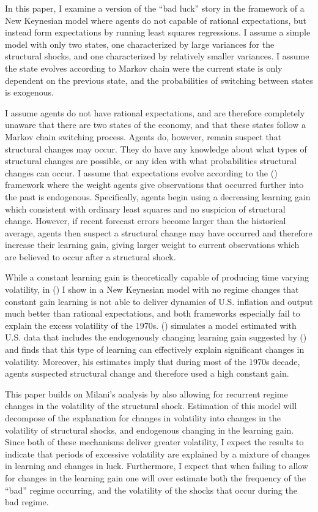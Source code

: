 \documentclass[12pt]{article}
\newcommand{\citee}[1]{\citename{#1} (\citeyear{#1})}
\begin{document}
In this paper, I examine a version of the ``bad luck'' story in the framework of a New Keynesian model where agents do not capable of rational expectations, but instead form expectations by running least squares regressions.  I assume a simple model with only two states, one characterized by large variances for the structural shocks, and one characterized by relatively smaller variances.  I assume the state evolves according to Markov chain were the current state is only dependent on the previous state, and the probabilities of switching between states is exogenous.  

I assume agents do not have rational expectations, and are therefore completely unaware that there are two states of the economy, and that these states follow a Markov chain switching process.  Agents do, however, remain suspect that structural changes may occur.  They do have any knowledge about what types of structural changes are possible, or any idea with what probabilities structural changes can occur.  I assume that expectations evolve according to the \citee{marcetnicolini2003} framework where the weight agents give observations that occurred further into the past is endogenous.  Specifically, agents begin using a decreasing learning gain which consistent with ordinary least squares and no suspicion of structural change.  However, if recent forecast errors become larger than the historical average, agents then suspect a structural change may have occurred and therefore increase their learning gain, giving larger weight to current observations which are believed to occur after a structural shock.

While a constant learning gain is theoretically capable of producing time varying volatility, in \citee{murray2007} I show in a New Keynesian model with no regime changes that constant gain learning is not able to deliver dynamics of U.S. inflation and output much better than rational expectations, and both frameworks especially fail to explain the excess volatility of the 1970s.  \citee{milani2007} simulates a model estimated with U.S. data that includes the endogenously changing learning gain suggested by \citee{marcetnicolini2003} and finds that this type of learning can effectively explain significant changes in volatility.  Moreover, his estimates imply that during most of the 1970s decade, agents suspected structural change and therefore used a high constant gain.  

This paper builds on Milani's analysis by also allowing for recurrent regime changes in the volatility of the structural shock.  Estimation of this model will decompose of the explanation for changes in volatility into changes in the volatility of structural shocks, and endogenous changing in the learning gain.  Since both of these mechanisms deliver greater volatility, I expect the results to indicate that periods of excessive volatility are explained by a mixture of changes in learning and changes in luck.  Furthermore, I expect that when failing to allow for changes in the learning gain one will over estimate both the frequency of the ``bad'' regime occurring, and the volatility of the shocks that occur during the bad regime.
\end{document}

